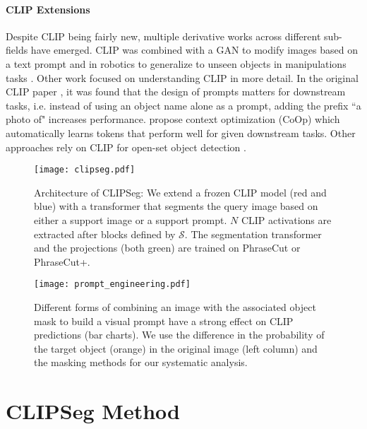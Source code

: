 \documentclass[10pt,twocolumn,letterpaper]{article}
\begin{document}
\paragraph{CLIP Extensions}
Despite CLIP \cite{radford20} being fairly new, multiple derivative works across different sub-fields have emerged.
CLIP was combined with a GAN to modify images based on a text prompt \cite{patashnik21styleclip} and
in robotics to generalize to unseen objects in manipulations tasks \cite{shridhar21cliport}.
Other work focused on understanding CLIP in more detail. In the original CLIP paper \cite{radford20}, it was found that the design of prompts matters for downstream tasks, i.e. instead of using an object name alone as a prompt, adding the prefix ``a photo of" increases performance. \citet{zhou21coop} propose context optimization (CoOp) which automatically learns tokens that perform well for given downstream tasks.
Other approaches rely on CLIP for open-set object detection \cite{gu21zero, esmaeilpour21zero}.








\begin{figure*}
\centering
 \texttt{[image: clipseg.pdf]}
\caption{Architecture of CLIPSeg: We extend a frozen CLIP model (red and blue) with a transformer that segments the query image based on either a support image or a support prompt. $N$ CLIP activations are extracted after blocks defined by $\mathcal{S}$. The segmentation transformer and the projections (both green) are trained on PhraseCut or PhraseCut+.}\label{fig:clipseg}
\end{figure*}

\begin{figure}
\centering
\texttt{[image: prompt\_engineering.pdf]}
\caption{Different forms of combining an image with the associated object mask to build a visual prompt have a strong effect on CLIP predictions (bar charts). We use the difference in the probability of the target object (orange) in the original image (left column) and the masking methods for our systematic analysis.}
\label{fig:prompt_engineering}
\end{figure}






\section{CLIPSeg Method}
\end{document}
